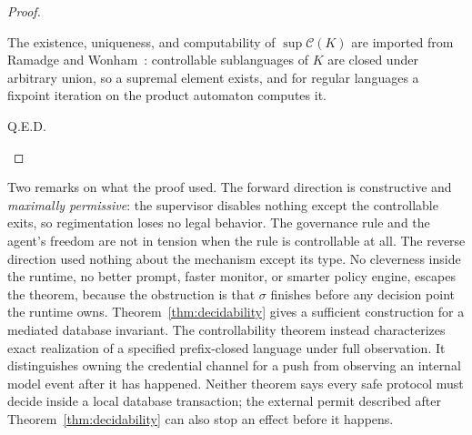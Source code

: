 \documentclass[11pt,a4paper]{article}
\theoremstyle{definition}
\theoremstyle{remark}
\begin{document}
\begin{proof}
\begin{description}[leftmargin=2.6em,style=nextline,itemsep=2pt]
\item[$.$] The existence, uniqueness, and computability of
  $\sup{}(K)$ are imported from Ramadge and Wonham~: controllable
  sublanguages of $K$ are closed under arbitrary union, so a supremal element exists, and for
  regular languages a fixpoint iteration on the product automaton computes it.
\item[$.$] \textsc{Q.E.D.}
\end{description}
\end{proof}

Two remarks on what the proof used. The forward direction is constructive and \emph{maximally
permissive}: the supervisor disables nothing except the controllable exits, so regimentation
loses no legal behavior. The governance rule and the agent's freedom are not in tension when
the rule is controllable at all. The reverse direction used nothing about the mechanism
except its type. No cleverness inside the runtime, no better prompt, faster monitor, or
smarter policy engine, escapes the theorem, because the obstruction is that $\sigma$ finishes
before any decision point the runtime owns. Theorem~\ref{thm:decidability} gives a sufficient
construction for a mediated database invariant. The controllability theorem
instead characterizes exact realization of a specified prefix-closed language
under full observation. It distinguishes owning the credential channel for a
push from observing an internal model event after it has happened. Neither
theorem says every safe protocol must decide inside a local database
transaction; the external permit described after
Theorem~\ref{thm:decidability} can also stop an effect before it happens.
\end{document}
